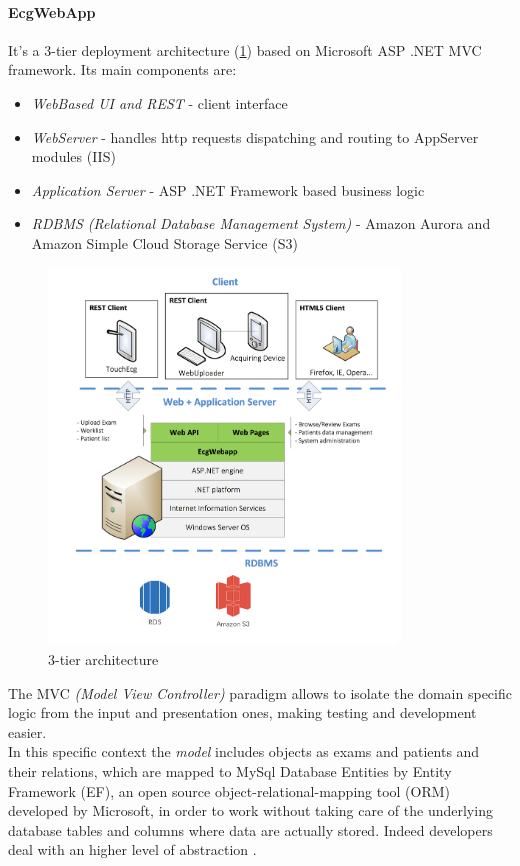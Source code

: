 \paragraph{EcgWebApp}
\label{paragraph:ecgwebapp}
It's a 3-tier deployment architecture (\ref{fig:tiers_diagram}) based on Microsoft ASP .NET MVC framework. Its main components are:
\begin{itemize}
    \item \textit{WebBased UI and REST} - client interface
    \item \textit{WebServer} - handles http requests dispatching and routing to AppServer modules (IIS)
    \item \textit{Application Server} - ASP .NET Framework based business logic
    \item \textit{RDBMS (Relational Database Management System)} - Amazon Aurora and Amazon Simple Cloud Storage Service (S3)
\end{itemize}
\begin{figure}[h]
    \centering
    \includegraphics[width=\textwidth,height=10cm,keepaspectratio]{img/tiers_diagram}
    \caption{3-tier architecture}
    \label{fig:tiers_diagram}
\end{figure}
The MVC \textit{(Model View Controller)} paradigm allows to isolate the domain specific logic from the input and presentation ones, making testing and development easier. \cite{mvc}\\
In this specific context the \textit{model} includes objects as exams and patients and their relations, which are mapped to MySql Database Entities by Entity Framework (EF), an open source object-relational-mapping tool (ORM) developed by Microsoft, in order to work without taking care of the underlying database tables and columns where data are actually stored. Indeed developers deal with an higher level of abstraction \cite{wikipedia_ef}.\\
